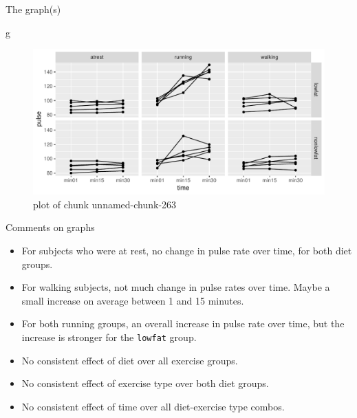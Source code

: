 \documentclass[ignorenonframetext,]{beamer}
\newenvironment{Shaded}{\begin{snugshade}}{\end{snugshade}}
\newcommand{\NormalTok}[1]{#1}
\begin{document}
\begin{frame}[fragile]{The graph(s)}
\protect\hypertarget{the-graphs}{}

\begin{Shaded}
\begin{Highlighting}[]
\NormalTok{g}
\end{Highlighting}
\end{Shaded}

\begin{figure}
\centering
\includegraphics{figure/unnamed-chunk-263-1.pdf}
\caption{plot of chunk unnamed-chunk-263}
\end{figure}

\end{frame}

\begin{frame}[fragile]{Comments on graphs}
\protect\hypertarget{comments-on-graphs}{}

\begin{itemize}
\item
  For subjects who were at rest, no change in pulse rate over time, for
  both diet groups.
\item
  For walking subjects, not much change in pulse rates over time. Maybe
  a small increase on average between 1 and 15 minutes.
\item
  For both running groups, an overall increase in pulse rate over time,
  but the increase is stronger for the \texttt{lowfat} group.
\item
  No consistent effect of diet over all exercise groups.
\item
  No consistent effect of exercise type over both diet groups.
\item
  No consistent effect of time over all diet-exercise type combos.
\end{itemize}

\end{frame}
\end{document}
